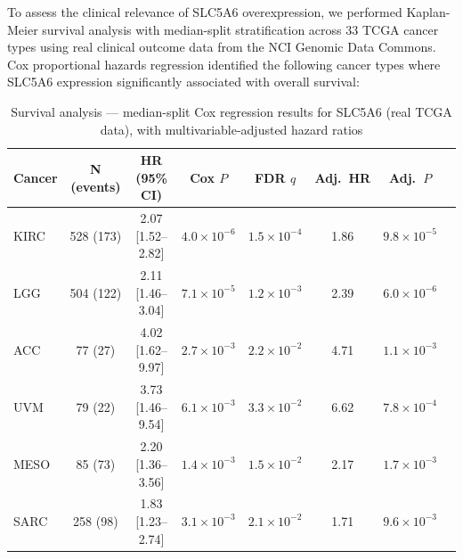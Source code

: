 \documentclass[10pt,letterpaper]{article}
\begin{document}
To assess the clinical relevance of SLC5A6 overexpression, we performed Kaplan-Meier survival analysis with median-split stratification across 33 TCGA cancer types using real clinical outcome data from the NCI Genomic Data Commons. Cox proportional hazards regression identified the following cancer types where SLC5A6 expression significantly associated with overall survival:

\begin{table}[t]
\centering
\caption{Survival analysis --- median-split Cox regression results for SLC5A6 (real TCGA data), with multivariable-adjusted hazard ratios}
\label{tab:survival}
\begin{tabular}{lccccccc}
\toprule
Cancer & N (events) & HR (95\% CI) & Cox $P$ & FDR $q$ & Adj.\ HR & Adj.\ $P$ \\
\midrule
KIRC & 528 (173) & 2.07 [1.52--2.82] & $4.0\times10^{-6}$ & $1.5\times10^{-4}$ & 1.86 & $9.8\times10^{-5}$ \\
LGG & 504 (122) & 2.11 [1.46--3.04] & $7.1\times10^{-5}$ & $1.2\times10^{-3}$ & 2.39 & $6.0\times10^{-6}$ \\
ACC & 77 (27) & 4.02 [1.62--9.97] & $2.7\times10^{-3}$ & $2.2\times10^{-2}$ & 4.71 & $1.1\times10^{-3}$ \\
UVM & 79 (22) & 3.73 [1.46--9.54] & $6.1\times10^{-3}$ & $3.3\times10^{-2}$ & 6.62 & $7.8\times10^{-4}$ \\
MESO & 85 (73) & 2.20 [1.36--3.56] & $1.4\times10^{-3}$ & $1.5\times10^{-2}$ & 2.17 & $1.7\times10^{-3}$ \\
SARC & 258 (98) & 1.83 [1.23--2.74] & $3.1\times10^{-3}$ & $2.1\times10^{-2}$ & 1.71 & $9.6\times10^{-3}$ \\
\bottomrule
\end{tabular}
\end{table}
\end{document}
